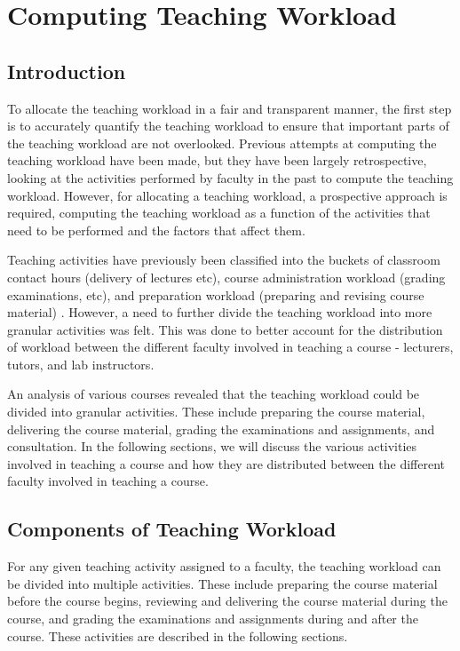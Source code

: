 \chapter{Computing Teaching Workload}
\label{ch:teaching_workload}

\section{Introduction}

To allocate the teaching workload in a fair and transparent manner, the first step is to accurately quantify the teaching workload to ensure that important parts of the teaching workload are not overlooked. Previous attempts at computing the teaching workload have been made, but they have been largely retrospective, looking at the activities performed by faculty in the past to compute the teaching workload. However, for allocating a teaching workload, a prospective approach is required, computing the teaching workload as a function of the activities that need to be performed and the factors that affect them.

Teaching activities have previously been classified into the buckets of classroom contact hours (delivery of lectures etc), course administration workload (grading examinations, etc), and preparation workload (preparing and revising course material) \cite{griffith2020framework}. However, a need to further divide the teaching workload into more granular activities was felt. This was done to better account for the distribution of workload between the different faculty involved in teaching a course - lecturers, tutors, and lab instructors.

An analysis of various courses revealed that the teaching workload could be divided into granular activities. These include preparing the course material, delivering the course material, grading the examinations and assignments, and consultation. In the following sections, we will discuss the various activities involved in teaching a course and how they are distributed between the different faculty involved in teaching a course.

\section{Components of Teaching Workload}

For any given teaching activity assigned to a faculty, the teaching workload can be divided into multiple activities. These include preparing the course material before the course begins, reviewing and delivering the course material during the course, and grading the examinations and assignments during and after the course. These activities are described in the following sections.

